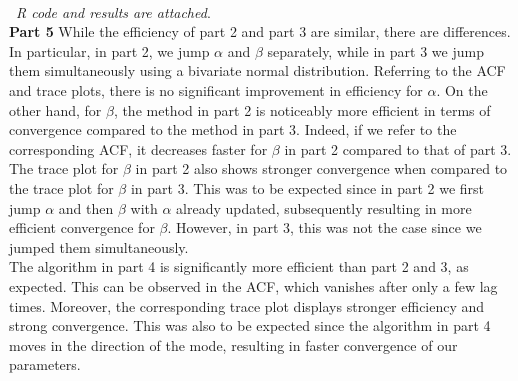 \documentclass[10pt,a4paper]{article}
\begin{document}
\begin{problem}{5}
\\\
\textit{R code and results are attached}.\\
\textbf{Part 5} While the efficiency of part 2 and part 3 are similar, there are differences.  In particular, in part 2, we  jump $\alpha$ and $\beta$ separately, while in part 3 we jump them simultaneously using a bivariate normal distribution. Referring to the ACF and trace plots, there is no significant improvement in efficiency for $\alpha$. On the other hand, for $\beta$,  the method in part 2 is noticeably more efficient in terms of convergence compared to the method in part 3. Indeed, if we refer to the corresponding ACF, it decreases faster for $\beta$ in part 2 compared to that of part 3. The trace plot for $\beta$ in part 2 also shows stronger convergence when compared to the trace plot for $\beta$ in part 3. This was to be expected since in part 2 we first jump $\alpha$ and then $\beta$ with $\alpha$ already updated, subsequently resulting in more efficient convergence for $\beta$. However, in part 3, this was not the case since we jumped them simultaneously.\\ The algorithm in part 4 is significantly more efficient than part 2 and 3, as expected. This can be observed in the ACF, which vanishes after only a few lag times. Moreover, the corresponding trace plot displays stronger efficiency and strong convergence. This was also to be expected since the algorithm in part 4 moves in the direction of the mode, resulting in faster convergence of our parameters. 
\end{problem}
\end{document}
